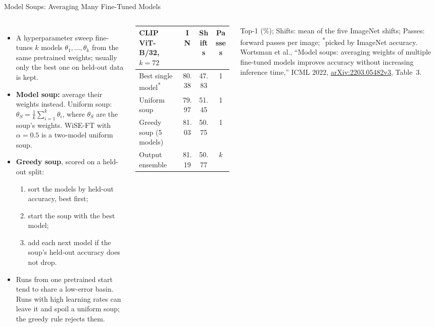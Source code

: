 \begin{frame}{Model Soups: Averaging Many Fine-Tuned Models}
  \begin{columns}[T,onlytextwidth]
      \begin{itemize}\footnotesize\itemsep0.3em
        \item A hyperparameter sweep fine-tunes $k$ models $\theta_1,\dots,\theta_k$ from the same pretrained weights; usually only the best one on held-out data is kept.
        \item \textbf{Model soup:} average their weights instead. Uniform soup: $\theta_S = \frac{1}{k}\sum_{i=1}^{k}\theta_i$, where $\theta_S$ are the soup's weights. WiSE-FT with $\alpha = 0.5$ is a two-model uniform soup.
        \item \textbf{Greedy soup}, scored on a held-out split:
          \begin{enumerate}\footnotesize\itemsep0.05em
            \item sort the models by held-out accuracy, best first;
            \item start the soup with the best model;
            \item add each next model if the soup's held-out accuracy does not drop.
          \end{enumerate}
        \item Runs from one pretrained start tend to share a low-error basin. Runs with high learning rates can leave it and spoil a uniform soup; the greedy rule rejects them.
      \end{itemize}
      {\centering\scriptsize\setlength{\tabcolsep}{3pt}
      \begin{tabular}{l c c c}
        \toprule
        CLIP ViT-B/32, $k = 72$ & IN & Shifts & Passes \\
        \midrule
        Best single model\textsuperscript{*} & 80.38 & 47.83 & 1 \\
        Uniform soup & 79.97 & 51.45 & 1 \\
        Greedy soup (5 models) & 81.03 & 50.75 & 1 \\
        Output ensemble & 81.19 & 50.77 & $k$ \\
        \bottomrule
      \end{tabular}\par}
      \vspace{0.2em}
      {\scriptsize Top-1 (\%); Shifts: mean of the five ImageNet shifts; Passes: forward passes per image; \textsuperscript{*}picked by ImageNet accuracy. Wortsman et al., ``Model soups: averaging weights of multiple fine-tuned models improves accuracy without increasing inference time,'' ICML 2022, \href{https://arxiv.org/abs/2203.05482v3}{arXiv:2203.05482v3}, Table~3.\par}

\end{columns}
\end{frame}
